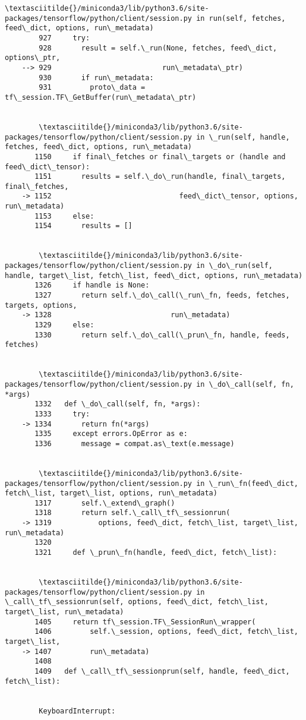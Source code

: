 \documentclass[11pt]{article}
\begin{document}
\begin{Verbatim}[commandchars=\\\{\}]
        \textasciitilde{}/miniconda3/lib/python3.6/site-packages/tensorflow/python/client/session.py in run(self, fetches, feed\_dict, options, run\_metadata)
        927     try:
        928       result = self.\_run(None, fetches, feed\_dict, options\_ptr,
    --> 929                          run\_metadata\_ptr)
        930       if run\_metadata:
        931         proto\_data = tf\_session.TF\_GetBuffer(run\_metadata\_ptr)


        \textasciitilde{}/miniconda3/lib/python3.6/site-packages/tensorflow/python/client/session.py in \_run(self, handle, fetches, feed\_dict, options, run\_metadata)
       1150     if final\_fetches or final\_targets or (handle and feed\_dict\_tensor):
       1151       results = self.\_do\_run(handle, final\_targets, final\_fetches,
    -> 1152                              feed\_dict\_tensor, options, run\_metadata)
       1153     else:
       1154       results = []


        \textasciitilde{}/miniconda3/lib/python3.6/site-packages/tensorflow/python/client/session.py in \_do\_run(self, handle, target\_list, fetch\_list, feed\_dict, options, run\_metadata)
       1326     if handle is None:
       1327       return self.\_do\_call(\_run\_fn, feeds, fetches, targets, options,
    -> 1328                            run\_metadata)
       1329     else:
       1330       return self.\_do\_call(\_prun\_fn, handle, feeds, fetches)


        \textasciitilde{}/miniconda3/lib/python3.6/site-packages/tensorflow/python/client/session.py in \_do\_call(self, fn, *args)
       1332   def \_do\_call(self, fn, *args):
       1333     try:
    -> 1334       return fn(*args)
       1335     except errors.OpError as e:
       1336       message = compat.as\_text(e.message)


        \textasciitilde{}/miniconda3/lib/python3.6/site-packages/tensorflow/python/client/session.py in \_run\_fn(feed\_dict, fetch\_list, target\_list, options, run\_metadata)
       1317       self.\_extend\_graph()
       1318       return self.\_call\_tf\_sessionrun(
    -> 1319           options, feed\_dict, fetch\_list, target\_list, run\_metadata)
       1320 
       1321     def \_prun\_fn(handle, feed\_dict, fetch\_list):


        \textasciitilde{}/miniconda3/lib/python3.6/site-packages/tensorflow/python/client/session.py in \_call\_tf\_sessionrun(self, options, feed\_dict, fetch\_list, target\_list, run\_metadata)
       1405     return tf\_session.TF\_SessionRun\_wrapper(
       1406         self.\_session, options, feed\_dict, fetch\_list, target\_list,
    -> 1407         run\_metadata)
       1408 
       1409   def \_call\_tf\_sessionprun(self, handle, feed\_dict, fetch\_list):


        KeyboardInterrupt: 

    \end{Verbatim}
\end{document}
